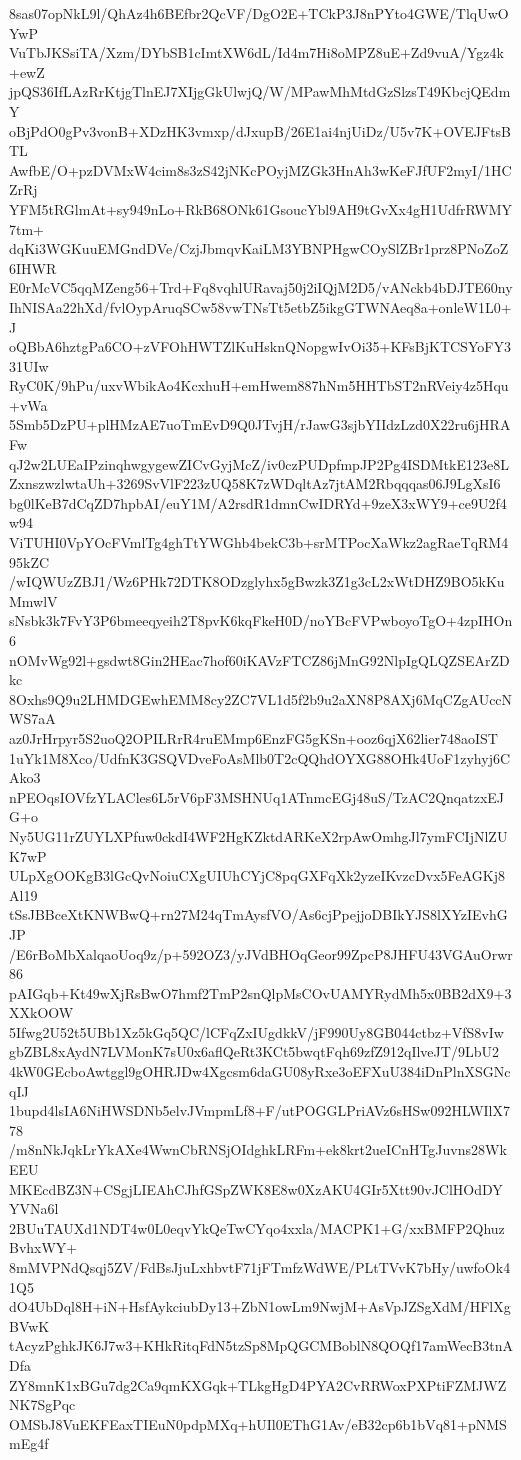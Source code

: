 8sas07opNkL9l/QhAz4h6BEfbr2QcVF/DgO2E+TCkP3J8nPYto4GWE/TlqUwOYwP
VuTbJKSsiTA/Xzm/DYbSB1cImtXW6dL/Id4m7Hi8oMPZ8uE+Zd9vuA/Ygz4k+ewZ
jpQS36IfLAzRrKtjgTlnEJ7XIjgGkUlwjQ/W/MPawMhMtdGzSlzsT49KbcjQEdmY
oBjPdO0gPv3vonB+XDzHK3vmxp/dJxupB/26E1ai4njUiDz/U5v7K+OVEJFtsBTL
AwfbE/O+pzDVMxW4cim8s3zS42jNKcPOyjMZGk3HnAh3wKeFJfUF2myI/1HCZrRj
YFM5tRGlmAt+sy949nLo+RkB68ONk61GsoucYbl9AH9tGvXx4gH1UdfrRWMY7tm+
dqKi3WGKuuEMGndDVe/CzjJbmqvKaiLM3YBNPHgwCOySlZBr1prz8PNoZoZ6IHWR
E0rMcVC5qqMZeng56+Trd+Fq8vqhlURavaj50j2iIQjM2D5/vANckb4bDJTE60ny
IhNISAa22hXd/fvlOypAruqSCw58vwTNsTt5etbZ5ikgGTWNAeq8a+onleW1L0+J
oQBbA6hztgPa6CO+zVFOhHWTZlKuHsknQNopgwIvOi35+KFsBjKTCSYoFY331UIw
RyC0K/9hPu/uxvWbikAo4KcxhuH+emHwem887hNm5HHTbST2nRVeiy4z5Hqu+vWa
5Smb5DzPU+plHMzAE7uoTmEvD9Q0JTvjH/rJawG3sjbYIIdzLzd0X22ru6jHRAFw
qJ2w2LUEaIPzinqhwgygewZICvGyjMcZ/iv0czPUDpfmpJP2Pg4ISDMtkE123e8L
ZxnszwzlwtaUh+3269SvVlF223zUQ58K7zWDqltAz7jtAM2Rbqqqas06J9LgXsI6
bg0lKeB7dCqZD7hpbAI/euY1M/A2rsdR1dmnCwIDRYd+9zeX3xWY9+ce9U2f4w94
ViTUHI0VpYOcFVmlTg4ghTtYWGhb4bekC3b+srMTPocXaWkz2agRaeTqRM495kZC
/wIQWUzZBJ1/Wz6PHk72DTK8ODzglyhx5gBwzk3Z1g3cL2xWtDHZ9BO5kKuMmwlV
sNsbk3k7FvY3P6bmeeqyeih2T8pvK6kqFkeH0D/noYBcFVPwboyoTgO+4zpIHOn6
nOMvWg92l+gsdwt8Gin2HEac7hof60iKAVzFTCZ86jMnG92NlpIgQLQZSEArZDkc
8Oxhs9Q9u2LHMDGEwhEMM8cy2ZC7VL1d5f2b9u2aXN8P8AXj6MqCZgAUccNWS7aA
az0JrHrpyr5S2uoQ2OPILRrR4ruEMmp6EnzFG5gKSn+ooz6qjX62lier748aoIST
1uYk1M8Xco/UdfnK3GSQVDveFoAsMlb0T2cQQhdOYXG88OHk4UoF1zyhyj6CAko3
nPEOqsIOVfzYLACles6L5rV6pF3MSHNUq1ATnmcEGj48uS/TzAC2QnqatzxEJG+o
Ny5UG11rZUYLXPfuw0ckdI4WF2HgKZktdARKeX2rpAwOmhgJl7ymFCIjNlZUK7wP
ULpXgOOKgB3lGcQvNoiuCXgUIUhCYjC8pqGXFqXk2yzeIKvzcDvx5FeAGKj8Al19
tSsJBBceXtKNWBwQ+rn27M24qTmAysfVO/As6cjPpejjoDBIkYJS8lXYzIEvhGJP
/E6rBoMbXalqaoUoq9z/p+592OZ3/yJVdBHOqGeor99ZpcP8JHFU43VGAuOrwr86
pAIGqb+Kt49wXjRsBwO7hmf2TmP2snQlpMsCOvUAMYRydMh5x0BB2dX9+3XXkOOW
5Ifwg2U52t5UBb1Xz5kGq5QC/lCFqZxIUgdkkV/jF990Uy8GB044ctbz+VfS8vIw
gbZBL8xAydN7LVMonK7sU0x6aflQeRt3KCt5bwqtFqh69zfZ912qIlveJT/9LbU2
4kW0GEcboAwtggl9gOHRJDw4Xgcsm6daGU08yRxe3oEFXuU384iDnPlnXSGNcqIJ
1bupd4lsIA6NiHWSDNb5elvJVmpmLf8+F/utPOGGLPriAVz6sHSw092HLWIlX778
/m8nNkJqkLrYkAXe4WwnCbRNSjOIdghkLRFm+ek8krt2ueICnHTgJuvns28WkEEU
MKEcdBZ3N+CSgjLIEAhCJhfGSpZWK8E8w0XzAKU4GIr5Xtt90vJClHOdDYYVNa6l
2BUuTAUXd1NDT4w0L0eqvYkQeTwCYqo4xxla/MACPK1+G/xxBMFP2QhuzBvhxWY+
8mMVPNdQsqj5ZV/FdBsJjuLxhbvtF71jFTmfzWdWE/PLtTVvK7bHy/uwfoOk41Q5
dO4UbDql8H+iN+HsfAykciubDy13+ZbN1owLm9NwjM+AsVpJZSgXdM/HFlXgBVwK
tAcyzPghkJK6J7w3+KHkRitqFdN5tzSp8MpQGCMBoblN8QOQf17amWecB3tnADfa
ZY8mnK1xBGu7dg2Ca9qmKXGqk+TLkgHgD4PYA2CvRRWoxPXPtiFZMJWZNK7SgPqc
OMSbJ8VuEKFEaxTIEuN0pdpMXq+hUIl0EThG1Av/eB32cp6b1bVq81+pNMSmEg4f
